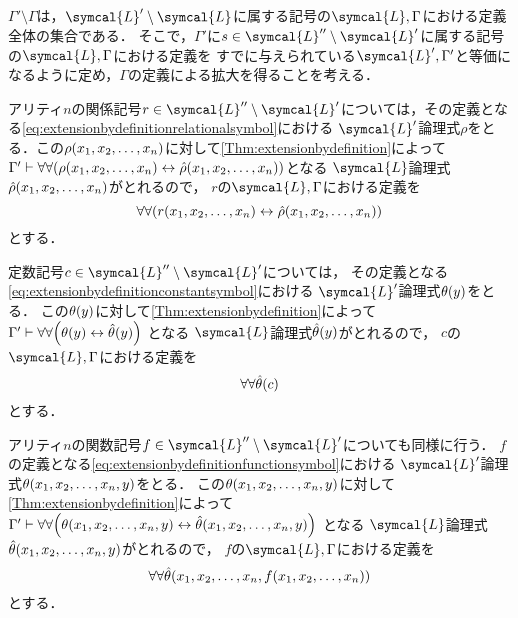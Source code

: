\subsection*{}

\(\Gamma' \setminus \Gamma\)は，\(\symcal{L}' \setminus \symcal{L}\)に属する記号の\(\symcal{L}, \Gamma\)における定義全体の集合である．
そこで，\(\Gamma'\)に\(s \in \symcal{L}'' \setminus \symcal{L}'\)に属する記号の\(\symcal{L}, \Gamma\)における定義を
すでに与えられている\(\symcal{L}', \Gamma'\)と等価になるように定め，\(\Gamma\)の定義による拡大を得ることを考える．

アリティ\(n\)の関係記号\(r \in \symcal{L}'' \setminus \symcal{L}'\)については，その定義となる\cref{eq:extensionbydefinitionrelationalsymbol}における
\(\symcal{L}'\)論理式\(\rho\)をとる．この\(\apply{\rho}{x_1,x_2,\dots,x_n}\)に対して\cref{Thm:extensionbydefinition}によって
\(\Gamma' \provable \forall \forall \paren{\apply{\rho}{x_1,x_2,\dots,x_n} \formulaequiv \apply{\hat{\rho}}{x_1,x_2,\dots,x_n}}\)となる
\(\symcal{L}\)論理式\(\apply{\hat{\rho}}{x_1,x_2,\dots,x_n}\)がとれるので，
\(r\)の\(\symcal{L}, \Gamma\)における定義を
\[
	\forall \forall \paren{\apply{r}{x_1,x_2,\dots,x_n} \formulaequiv \apply{\hat{\rho}}{x_1,x_2,\dots,x_n}}
\]
とする．

定数記号\(c \in \symcal{L}'' \setminus \symcal{L}'\)については，
その定義となる\cref{eq:extensionbydefinitionconstantsymbol}における
\(\symcal{L}'\)論理式\(\apply{\theta}{y}\)をとる．
この\(\apply{\theta}{y}\)に対して\cref{Thm:extensionbydefinition}によって
\(\Gamma' \provable \forall \forall \paren{\apply{\theta}{y} \formulaequiv \apply{\hat{\theta}}{y}}\)
となる
\(\symcal{L}\)論理式\(\apply{\hat{\theta}}{y}\)がとれるので，
\(c\)の\(\symcal{L}, \Gamma\)における定義を
\[
	\forall \forall \apply{\hat{\theta}}{c}
\]
とする．

アリティ\(n\)の関数記号\(f \in \symcal{L}'' \setminus \symcal{L}'\)についても同様に行う．
\(f\)の定義となる\cref{eq:extensionbydefinitionfunctionsymbol}における
\(\symcal{L}'\)論理式\(\apply{\theta}{x_1,x_2,\dots,x_n,y}\)をとる．
この\(\apply{\theta}{x_1,x_2,\dots,x_n,y}\)に対して\cref{Thm:extensionbydefinition}によって
\(\Gamma' \provable \forall \forall \paren{\apply{\theta}{x_1,x_2,\dots,x_n,y} \formulaequiv \apply{\hat{\theta}}{x_1,x_2,\dots,x_n,y}}\)
となる
\(\symcal{L}\)論理式\(\apply{\hat{\theta}}{x_1,x_2,\dots,x_n,y}\)がとれるので，
\(f\)の\(\symcal{L}, \Gamma\)における定義を
\[
	\forall \forall \apply{\hat{\theta}}{x_1,x_2,\dots,x_n, \apply{f}{x_1,x_2,\dots,x_n}}
\]
とする．

